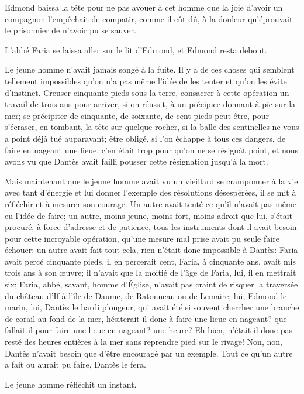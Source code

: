 Edmond baissa la tête pour ne pas avouer à cet homme que la joie d'avoir un compagnon l'empêchait de compatir, comme il eût dû, à la douleur qu'éprouvait le prisonnier de n'avoir pu se sauver.

L'abbé Faria se laissa aller sur le lit d'Edmond, et Edmond resta debout.

Le jeune homme n'avait jamais songé à la fuite. Il y a de ces choses qui semblent tellement impossibles qu'on n'a pas même l'idée de les tenter et qu'on les évite d'instinct. Creuser cinquante pieds sous la terre, consacrer à cette opération un travail de trois ans pour arriver, si on réussit, à un précipice donnant à pic sur la mer; se précipiter de cinquante, de soixante, de cent pieds peut-être, pour s'écraser, en tombant, la tête sur quelque rocher, si la balle des sentinelles ne vous a point déjà tué auparavant; être obligé, si l'on échappe à tous ces dangers, de faire en nageant une lieue, c'en était trop pour qu'on ne se résignât point, et nous avons vu que Dantès avait failli pousser cette résignation jusqu'à la mort.

Mais maintenant que le jeune homme avait vu un vieillard se cramponner à la vie avec tant d'énergie et lui donner l'exemple des résolutions désespérées, il se mit à réfléchir et à mesurer son courage. Un autre avait tenté ce qu'il n'avait pas même eu l'idée de faire; un autre, moins jeune, moins fort, moins adroit que lui, s'était procuré, à force d'adresse et de patience, tous les instruments dont il avait besoin pour cette incroyable opération, qu'une mesure mal prise avait pu seule faire échouer: un autre avait fait tout cela, rien n'était donc impossible à Dantès: Faria avait percé cinquante pieds, il en percerait cent, Faria, à cinquante ans, avait mis trois ans à son œuvre; il n'avait que la moitié de l'âge de Faria, lui, il en mettrait six; Faria, abbé, savant, homme d'Église, n'avait pas craint de risquer la traversée du château d'If à l'île de Daume, de Ratonneau ou de Lemaire; lui, Edmond le marin, lui, Dantès le hardi plongeur, qui avait été si souvent chercher une branche de corail au fond de la mer, hésiterait-il donc à faire une lieue en nageant? que fallait-il pour faire une lieue en nageant? une heure? Eh bien, n'était-il donc pas resté des heures entières à la mer sans reprendre pied sur le rivage! Non, non, Dantès n'avait besoin que d'être encouragé par un exemple. Tout ce qu'un autre a fait ou aurait pu faire, Dantès le fera.

Le jeune homme réfléchit un instant.

